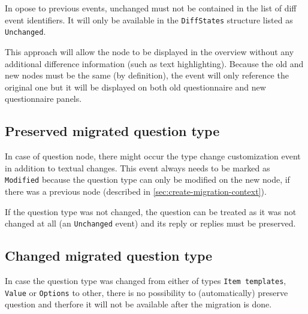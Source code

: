 In opose to previous events, unchanged must not be contained in the list of diff event identifiers.
It will only be available in the \texttt{DiffStates} structure listed as \texttt{Unchanged}.

This approach will allow the node to be displayed in the overview without any additional difference information (such as text highlighting).
Because the old and new nodes must be the same (by definition), the event will only reference the original one but it will be displayed on both old questionnaire and new questionnaire panels.

\subsection{Preserved migrated question type}

In case of question node, there might occur the type change customization event in addition to textual changes.
This event always needs to be marked as \texttt{Modified} because the question type can only be modified on the new node, if there was a previous node (described in \ref{sec:create-migration-context}).

If the question type was not changed, the question can be treated as it was not changed at all (an \texttt{Unchanged} event) and its reply or replies must be preserved.

\subsection{Changed migrated question type}

In case the question type was changed from either of types \texttt{Item templates}, \texttt{Value} or \texttt{Options} to other, there is no possibility to (automatically) preserve question and therfore it will not be available after the migration is done.
